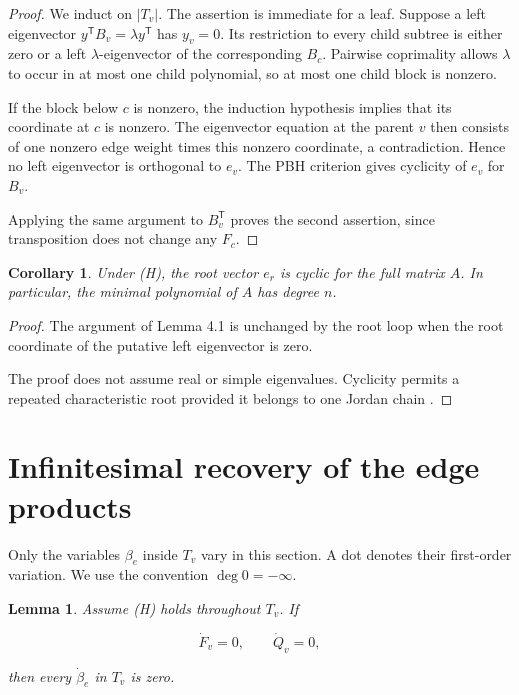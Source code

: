 \documentclass[11pt]{article}
\newtheorem{lemma}[theorem]{Lemma}
\newtheorem{corollary}[theorem]{Corollary}
\theoremstyle{remark}
\begin{document}
\begin{proof}

We induct on $|T_v|$. The assertion is immediate for a leaf. Suppose a left eigenvector $y^{\mathsf T}B_v=\lambda y^{\mathsf T}$ has $y_v=0$. Its restriction to every child subtree is either zero or a left $\lambda$-eigenvector of the corresponding $B_c$. Pairwise coprimality allows $\lambda$ to occur in at most one child polynomial, so at most one child block is nonzero.

If the block below $c$ is nonzero, the induction hypothesis implies that its coordinate at $c$ is nonzero. The eigenvector equation at the parent $v$ then consists of one nonzero edge weight times this nonzero coordinate, a contradiction. Hence no left eigenvector is orthogonal to $e_v$. The PBH criterion \cite{ref10} gives cyclicity of $e_v$ for $B_v$.

Applying the same argument to $B_v^{\mathsf T}$ proves the second assertion, since transposition does not change any $F_c$.

\end{proof}

\begin{corollary}

Under (H), the root vector $e_r$ is cyclic for the full matrix $A$. In particular, the minimal polynomial of $A$ has degree $n$.

\end{corollary}

\begin{proof}

The argument of Lemma 4.1 is unchanged by the root loop when the root coordinate of the putative left eigenvector is zero.

The proof does not assume real or simple eigenvalues. Cyclicity permits a repeated characteristic root provided it belongs to one Jordan chain \cite{ref9}.

\end{proof}

\section{Infinitesimal recovery of the edge products}


Only the variables $\beta_e$ inside $T_v$ vary in this section. A dot denotes their first-order variation. We use the convention $\deg0=-\infty$.

\begin{lemma}

Assume (H) holds throughout $T_v$. If

\[
\dot F_v=0,
\qquad
\dot Q_v=0,
\tag{5.1}
\]

then every $\dot\beta_e$ in $T_v$ is zero.

\end{lemma}
\end{document}
